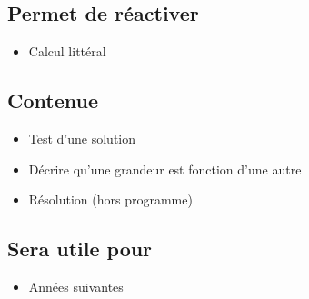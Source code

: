 \subsection{Permet de réactiver}
\begin{itemize}
    \item Calcul littéral
\end{itemize}

\subsection{Contenue}
\begin{itemize}
    \item Test d'une solution
    \item Décrire qu'une grandeur est fonction d'une autre
    \item Résolution (hors programme)
\end{itemize}

\subsection{Sera utile pour}
\begin{itemize}
    \item Années suivantes
\end{itemize}